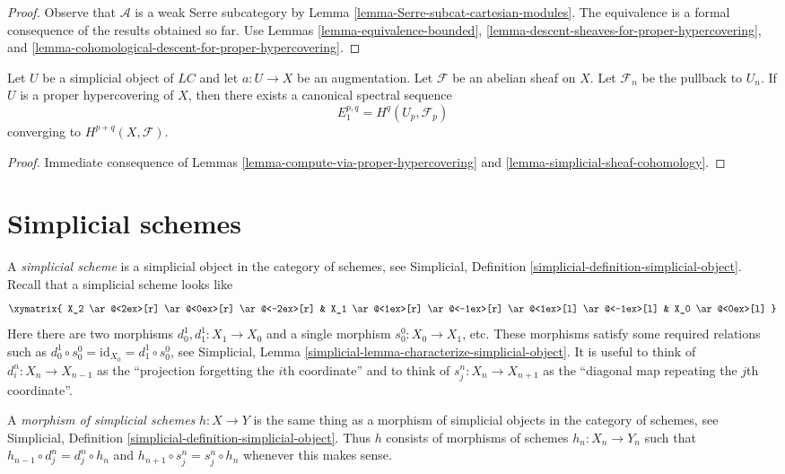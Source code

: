 \begin{proof}
Observe that $\mathcal{A}$ is a weak Serre subcategory by
Lemma \ref{lemma-Serre-subcat-cartesian-modules}.
The equivalence is a
formal consequence of the results obtained so far. Use
Lemmas \ref{lemma-equivalence-bounded},
\ref{lemma-descent-sheaves-for-proper-hypercovering}, and
\ref{lemma-cohomological-descent-for-proper-hypercovering}.
\end{proof}

\begin{lemma}
\label{lemma-spectral-sequence-proper-hypercovering}
Let $U$ be a simplicial object of $\textit{LC}$ and let
$a : U \to X$ be an augmentation. Let $\mathcal{F}$ be an abelian sheaf
on $X$. Let $\mathcal{F}_n$ be the pullback to $U_n$.
If $U$ is a proper hypercovering of $X$, then
there exists a canonical spectral sequence
$$
E_1^{p, q} = H^q(U_p, \mathcal{F}_p)
$$
converging to $H^{p + q}(X, \mathcal{F})$.
\end{lemma}

\begin{proof}
Immediate consequence of Lemmas \ref{lemma-compute-via-proper-hypercovering}
and \ref{lemma-simplicial-sheaf-cohomology}.
\end{proof}




\section{Simplicial schemes}
\label{section-simplicial}

\noindent
A {\it simplicial scheme} is a simplicial object in the category of schemes,
see Simplicial, Definition \ref{simplicial-definition-simplicial-object}.
Recall that a simplicial scheme looks like
$$
\xymatrix{
X_2
\ar@<2ex>[r]
\ar@<0ex>[r]
\ar@<-2ex>[r]
&
X_1
\ar@<1ex>[r]
\ar@<-1ex>[r]
\ar@<1ex>[l]
\ar@<-1ex>[l]
&
X_0
\ar@<0ex>[l]
}
$$
Here there are two morphisms $d^1_0, d^1_1 : X_1 \to X_0$
and a single morphism $s^0_0 : X_0 \to X_1$, etc.
These morphisms satisfy some required relations such as
$d^1_0 \circ s^0_0 = \text{id}_{X_0} = d^1_1 \circ s^0_0$, see
Simplicial, Lemma \ref{simplicial-lemma-characterize-simplicial-object}.
It is useful to think of $d^n_i : X_n \to X_{n - 1}$
as the ``projection forgetting the $i$th coordinate'' and
to think of $s^n_j : X_n \to X_{n + 1}$ as the ``diagonal map repeating
the $j$th coordinate''.

\medskip\noindent
A {\it morphism of simplicial schemes} $h : X \to Y$ is the same
thing as a morphism of simplicial objects in the category of schemes,
see Simplicial, Definition \ref{simplicial-definition-simplicial-object}.
Thus $h$ consists of morphisms of schemes $h_n : X_n \to Y_n$
such that $h_{n - 1} \circ d^n_j = d^n_j \circ h_n$ and
$h_{n + 1} \circ s^n_j = s^n_j \circ h_n$ whenever this makes sense.

